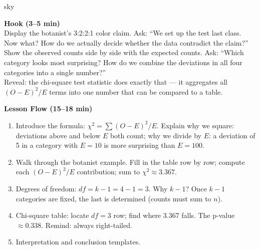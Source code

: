 \documentclass[10pt]{article}
\begin{document}
\begin{skillbox}{sky}
\begin{minipage}[t]{0.48\linewidth}
    \textbf{Hook (3--5 min)}\\
    Display the botanist's 3:2:2:1 color claim. Ask: ``We set up the test last
    class. Now what? How do we actually decide whether the data contradict the
    claim?''\\[4pt]
    Show the observed counts side by side with the expected counts. Ask:
    ``Which category looks most surprising? How do we combine the deviations
    in all four categories into a single number?''\\[4pt]
    Reveal: the chi-square test statistic does exactly that --- it aggregates
    all $(O - E)^2 / E$ terms into one number that can be compared to a table.
\end{minipage}
\hfill
\begin{minipage}[t]{0.48\linewidth}
    \textbf{Lesson Flow (15--18 min)}
    \begin{enumerate}
        \item Introduce the formula: $\chi^2 = \sum (O - E)^2 / E$.
              Explain why we square: deviations above and below $E$ both count;
              why we divide by $E$: a deviation of 5 in a category with $E = 10$
              is more surprising than $E = 100$.
        \item Walk through the botanist example. Fill in the table row by row;
              compute each $(O - E)^2 / E$ contribution; sum to $\chi^2 \approx 3.367$.
        \item Degrees of freedom: $df = k - 1 = 4 - 1 = 3$. Why $k - 1$?
              Once $k - 1$ categories are fixed, the last is determined (counts
              must sum to $n$).
        \item Chi-square table: locate $df = 3$ row; find where 3.367 falls.
              The p-value $\approx 0.338$. Remind: always right-tailed.
        \item Interpretation and conclusion templates.
    \end{enumerate}
\end{minipage}
\end{skillbox}
\end{document}
